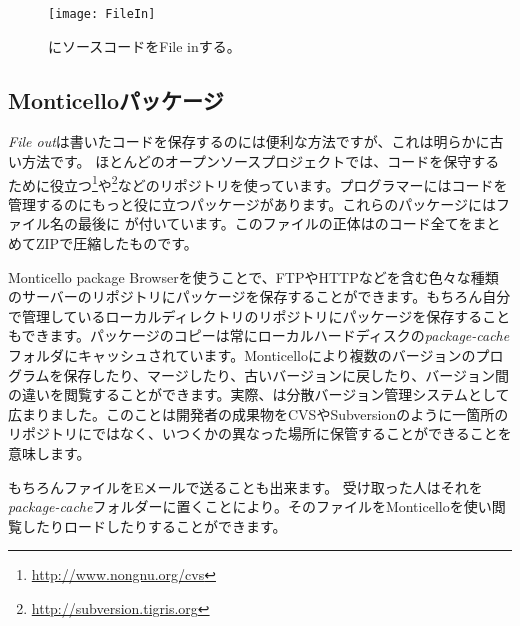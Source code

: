 \documentclass[a4paper,10pt,twoside]{book}
\begin{document}

\begin{figure}[ht]
\centerline {\texttt{[image: FileIn]}}
\caption{\pharo にソースコードをFile inする。
}
\end{figure}

\subsection{Monticelloパッケージ}
\emph{File out}は書いたコードを保存するのには便利な方法ですが、これは明らかに古い方法です。
ほとんどのオープンソースプロジェクトでは、コードを保守するために役立つ\footnote{\url{http://www.nongnu.org/cvs}}や\footnote{\url{http://subversion.tigris.org}}などのリポジトリを使っています。\pharo プログラマーにはコードを管理するのにもっと役に立つパッケージがあります。これらのパッケージにはファイル名の最後に が付いています。このファイルの正体はのコード全てをまとめてZIPで圧縮したものです。

Monticello package Browserを使うことで、FTPやHTTPなどを含む色々な種類のサーバーのリポジトリにパッケージを保存することができます。もちろん自分で管理しているローカルディレクトリのリポジトリにパッケージを保存することもできます。パッケージのコピーは常にローカルハードディスクの\emph{package-cache}フォルダにキャッシュされています。Monticelloにより複数のバージョンのプログラムを保存したり、マージしたり、古いバージョンに戻したり、バージョン間の違いを閲覧することができます。実際、は分散バージョン管理システムとして広まりました。このことは開発者の成果物をCVSやSubversionのように一箇所のリポジトリにではなく、いつくかの異なった場所に保管することができることを意味します。

もちろんファイルをEメールで送ることも出来ます。
受け取った人はそれを\emph{package-cache}フォルダーに置くことにより。そのファイルをMonticelloを使い閲覧したりロードしたりすることができます。
\end{document}
